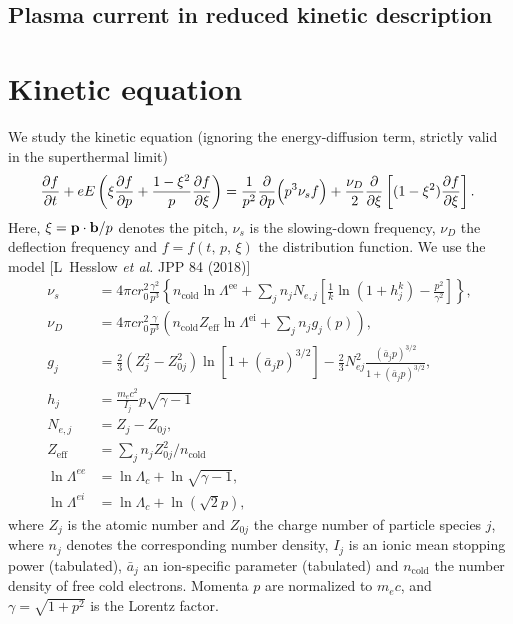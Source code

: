 \documentclass[11pt,a4paper]{article}
\newcommand{\sub}[1]{\ensuremath{_{\text{#1}}}}
\renewcommand{\b}[1]{\ensuremath{ {\bf #1 } }}
\begin{document}
\subsection*{Plasma current in reduced kinetic description}


\section{Kinetic equation}


We study the kinetic equation (ignoring the energy-diffusion term, strictly valid in the superthermal limit) 
\begin{align}
\hspace{-1mm}\frac{\partial f}{\partial t} + eE\left(\xi\frac{\partial f}{\partial p} + \frac{1-\xi^2}{p}\frac{\partial f}{\partial \xi}\right) = \frac{1}{p^2}\frac{\partial}{\partial p}\Big(p^3 \nu_s  f\Big) + \frac{\nu_D}{2}\frac{\partial}{\partial \xi}\left[(1-\xi^2)\frac{\partial f}{\partial \xi}\right].
\end{align}
Here, $\xi = \b{p}\cdot\b{b}/p$ denotes the pitch, $\nu_s$ is the slowing-down frequency, $\nu_D$ the deflection frequency and $f=f(t,\,p,\,\xi)$ the distribution function. We use the model [L~Hesslow \emph{et al.} JPP 84 (2018)]
\begin{align}
\nu_s &= 4\pi c r_0^2 \frac{\gamma^2}{p^3} \left\{n\sub{cold} \ln\Lambda^\text{ee} + \sum_j n_j N_{e,j}\left[\frac{1}{k}\ln(1+ h_j^k)  - \frac{p^2}{\gamma^2}\right]\right\} , \nonumber \\
\nu_D &= 4\pi c r_0^2\frac{\gamma}{p^3} \left( n\sub{cold} Z\sub{eff} \ln\Lambda^\text{ei} + \sum_j n_j g_j(p) \right), \nonumber \\
g_j &= \frac{2}{3} (Z_j^2-Z_{0j}^2)\ln[1+ (\bar{a}_jp)^{3/2}] - \frac{2}{3}N_{ej}^2\frac{(\bar{a}_j p)^{3/2}}{1+(\bar{a}_j p)^{3/2}}, \nonumber \\
h_j &= \frac{m_e c^2}{I_j}p\sqrt{\gamma-1}\nonumber \\
N_{e,j} &= Z_j-Z_{0j}, \nonumber \\
Z\sub{eff} &= \sum_j n_j Z_{0j}^2/n\sub{cold}  \nonumber \\
\ln\Lambda^{ee} &= \ln\Lambda_c + \ln\sqrt{\gamma-1}, \nonumber \\
\ln\Lambda^{ei} &= \ln\Lambda_c + \ln(\sqrt{2}p), 
\end{align}
where $Z_j$ is the atomic number and $Z_{0j}$ the charge number of particle species $j$, where $n_j$ denotes the corresponding number density, $I_j$ is an ionic mean stopping power (tabulated), $\bar{a}_j$ an ion-specific parameter (tabulated) and $n\sub{cold}$ the number density of free cold electrons. Momenta $p$ are normalized to $m_e c$, and $\gamma = \sqrt{1+p^2}$ is the Lorentz factor. 
\end{document}
